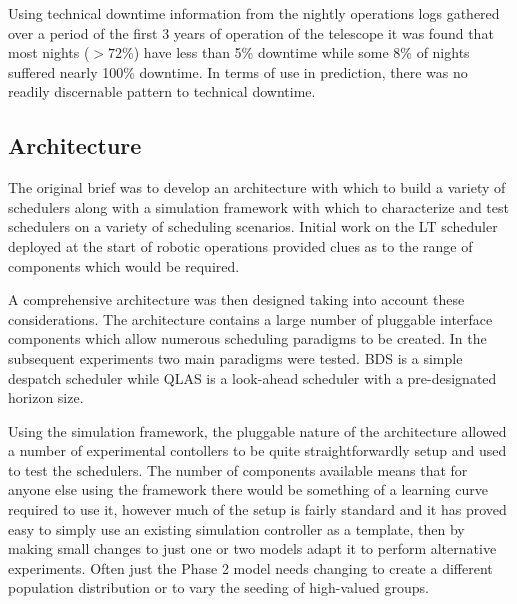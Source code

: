 

Using technical downtime information from the nightly operations logs gathered over a period of the first 3 years of operation of the telescope it was found that most nights ($>72$\%) have less than 5\% downtime while some 8\% of nights suffered nearly 100\% downtime. In terms of use in prediction, there was no readily discernable pattern to technical downtime.
 


\subsection{Architecture}
The original brief was to develop an architecture with which to build a variety of schedulers along with a simulation framework with which to characterize and test schedulers on a variety of scheduling scenarios. Initial work on the LT scheduler deployed at the start of robotic operations provided clues as to the range of components which would be required. 

A comprehensive architecture was then designed taking into account these considerations. The architecture contains a large number of pluggable interface components which allow numerous scheduling paradigms to be created. In the subsequent experiments two main paradigms were tested. BDS is a simple despatch scheduler while QLAS is a look-ahead scheduler with a pre-designated horizon size. 

Using the simulation framework, the pluggable nature of the architecture allowed a number of experimental contollers to be quite straightforwardly setup and used to test the schedulers. The number of components available means that for anyone else using the framework there would be something of a learning curve required to use it, however much of the setup is fairly standard and it has proved easy to simply use an existing simulation controller as a template, then by making small changes to just one or two models adapt it to perform alternative experiments. Often just the Phase 2 model needs changing to create a different population distribution or to vary the seeding of high-valued groups.

